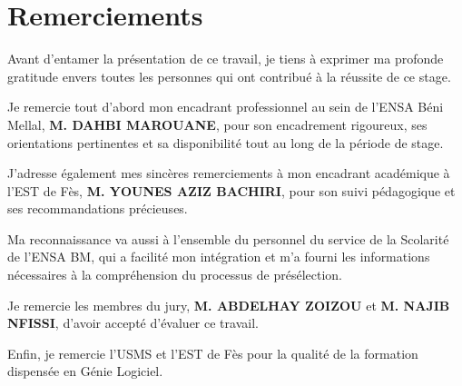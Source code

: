 

\chapter*{Remerciements}

Avant d'entamer la présentation de ce travail, je tiens à exprimer ma profonde gratitude envers toutes les personnes qui ont contribué à la réussite de ce stage.

Je remercie tout d'abord mon encadrant professionnel au sein de l'ENSA Béni Mellal, \textbf{M. DAHBI MAROUANE}, pour son encadrement rigoureux, ses orientations pertinentes et sa disponibilité tout au long de la période de stage.

J'adresse également mes sincères remerciements à mon encadrant académique à l'EST de Fès, \textbf{M. YOUNES AZIZ BACHIRI}, pour son suivi pédagogique et ses recommandations précieuses.

Ma reconnaissance va aussi à l'ensemble du personnel du service de la Scolarité de l'ENSA BM, qui a facilité mon intégration et m'a fourni les informations nécessaires à la compréhension du processus de présélection.

Je remercie les membres du jury, \textbf{M. ABDELHAY ZOIZOU} et \textbf{M. NAJIB NFISSI}, d'avoir accepté d'évaluer ce travail.

Enfin, je remercie l'USMS et l'EST de Fès pour la qualité de la formation dispensée en Génie Logiciel.
